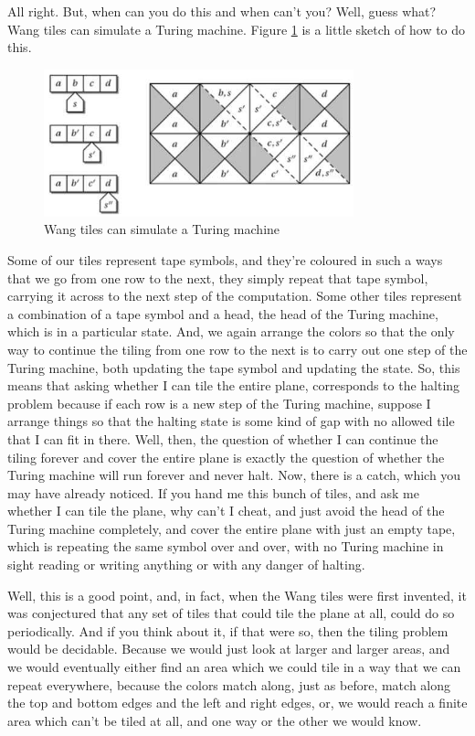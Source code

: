 \documentclass[]{article}
\begin{document}
All right. But, when can you do this and when can't you? Well, guess what? Wang tiles can simulate a Turing machine. Figure \ref{fig:wang-turing} is a little sketch of how to do this.

\begin{figure}[H]
	\caption{Wang tiles can simulate a Turing machine}\label{fig:wang-turing}
	\includegraphics[width=0.8\textwidth]{wang-turing}
\end{figure}
Some of our tiles represent
tape symbols,
and they're coloured in such a ways
that we go from one row to the next,
they simply repeat that tape symbol,
carrying it across to the next step
of the computation.
Some other tiles
represent a combination
of a tape symbol and a head,
the head of the Turing machine,
which is in a particular state.
And, we again arrange the colors
so that the only way to continue
the tiling from one row to the next
is to carry out one step
of the Turing machine,
both updating the tape symbol
and updating the state.
So, this means
that asking whether I can tile
the entire plane,
corresponds to the halting problem
because if each row is a new step
of the Turing machine,
suppose I arrange things so that
the halting state
is some kind of gap
with no allowed tile
that I can fit in there.
Well, then, the question of whether
I can continue the tiling forever
and cover the entire plane
is exactly the question of whether
the Turing machine will run forever
and never halt.
Now, there is a catch,
which you may have already noticed.
If you hand me this bunch of tiles,
and ask me whether I can tile the plane,
why can't I cheat,
and just avoid the head of the
Turing machine completely,
and cover the entire plane
with just an empty tape,
which is repeating the same symbol
over and over,
with no Turing machine in sight
reading or writing anything
or with any danger of halting.

Well, this is a good point,
and, in fact, when the Wang tiles
were first invented, it was conjectured
that any set of tiles
that could tile the plane at all,
could do so periodically.
And if you think about it,
if that were so,
then the tiling problem would be
decidable.
Because we would just look at
larger and larger areas,
and we would eventually
either find an area which we could tile
in a way that we can repeat everywhere,
because the colors match along,
just as before,
match along the top and bottom edges
and the left and right edges,
or,
we would reach a finite area
which can't be tiled at all,
and one way or the other
we would know.
\end{document}
